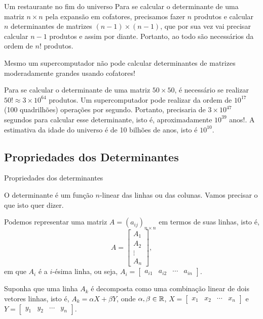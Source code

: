 \begin{frame}[label=determinantes]
\begin{block}{Um restaurante no fim do universo}
Para se calcular o determinante de uma matriz $n\times n$ pela expansão em cofatores, precisamos fazer $n$ produtos e calcular $n$ determinantes de matrizes $(n-1)\times (n-1)$, que por sua vez vai precisar calcular $n-1$ produtos e assim por diante. Portanto, ao todo são necessários da ordem de $n!$ produtos.
\medskip


Mesmo um supercomputador não pode calcular determinantes de matrizes moderadamente grandes usando cofatores!
\medskip


Para se calcular o determinante de uma matriz $50\times 50$, é necessário se realizar $50!\approx 3\times  10^{64}$ produtos. Um supercomputador pode realizar da ordem de $10^{17}$ (100 quadrilhões) operações por segundo. Portanto, precisaria de $3\times 10^{47}$ segundos para calcular esse determinante, isto é, aproximadamente $10^{39}$ anos!. A estimativa da idade do universo é de 10 bilhões de anos, isto é $10^{10}$.
\end{block}
\end{frame}

\subsection*{Propriedades dos Determinantes}


\begin{frame}[label=determinantes]{Propriedades dos determinantes}

O determinante é um {\color{blue}função $n$-linear} das linhas ou das colunas. Vamos precisar o que isto quer dizer.
\medskip

Podemos representar uma matriz $A=(a_{ij})_{n\times n}$  em termos de suas linhas, isto é, 
\[A=\begin{bmatrix}
A_1 \\ A_2 \\ \vdots\\ A_n
\end{bmatrix}, \]
em que $A_i$ é a $i$-ésima linha, ou seja, 
$A_i=\begin{bmatrix} a_{i1} & a_{i2} & \cdots & a_{in} \end{bmatrix}$. 


Suponha que uma linha $A_k$ é decomposta como uma combinação linear de dois vetores linhas, isto é, $A_k=\alpha X+\beta Y$, onde $\alpha,\beta \in \mathbb{R}$, 
$X=\begin{bmatrix} x_{1} & x_{2} & \cdots & x_{n} \end{bmatrix}$ e $Y=\begin{bmatrix} y_{1} & y_{2} & \cdots & y_{n} \end{bmatrix}$.



\end{frame}


